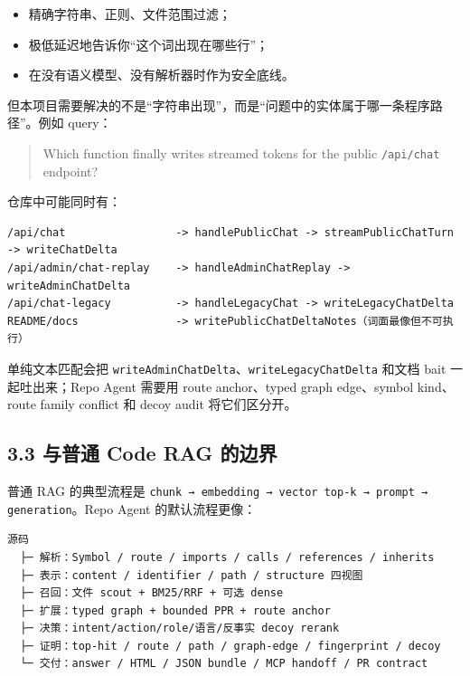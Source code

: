\documentclass[UTF8,12pt,openany]{ctexbook}
\begin{document}
\begin{itemize}
\item 精确字符串、正则、文件范围过滤；
\item 极低延迟地告诉你“这个词出现在哪些行”；
\item 在没有语义模型、没有解析器时作为安全底线。
\end{itemize}

但本项目需要解决的不是“字符串出现”，而是“问题中的实体属于哪一条程序路径”。例如 query：\par

\begin{quote}
Which function finally writes streamed tokens for the public \texttt{/api/chat} endpoint?
\end{quote}

仓库中可能同时有：\par

\begin{lstlisting}
/api/chat                 -> handlePublicChat -> streamPublicChatTurn -> writeChatDelta
/api/admin/chat-replay    -> handleAdminChatReplay -> writeAdminChatDelta
/api/chat-legacy          -> handleLegacyChat -> writeLegacyChatDelta
README/docs               -> writePublicChatDeltaNotes（词面最像但不可执行）
\end{lstlisting}

单纯文本匹配会把 \texttt{writeAdminChatDelta}、\texttt{writeLegacyChatDelta} 和文档 bait 一起吐出来；Repo Agent 需要用 route anchor、typed graph edge、symbol kind、route family conflict 和 decoy audit 将它们区分开。\par

\subsection{3.3 与普通 Code RAG 的边界}

普通 RAG 的典型流程是 \texttt{chunk → embedding → vector top-k → prompt → generation}。Repo Agent 的默认流程更像：\par

\begin{lstlisting}
源码
  ├─ 解析：Symbol / route / imports / calls / references / inherits
  ├─ 表示：content / identifier / path / structure 四视图
  ├─ 召回：文件 scout + BM25/RRF + 可选 dense
  ├─ 扩展：typed graph + bounded PPR + route anchor
  ├─ 决策：intent/action/role/语言/反事实 decoy rerank
  ├─ 证明：top-hit / route / path / graph-edge / fingerprint / decoy
  └─ 交付：answer / HTML / JSON bundle / MCP handoff / PR contract
\end{lstlisting}
\end{document}
